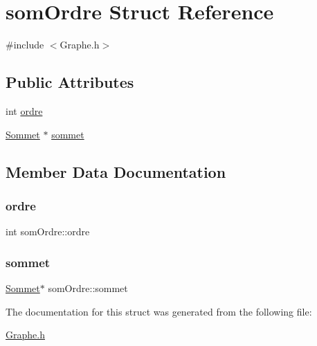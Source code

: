 \hypertarget{structsom_ordre}{}\section{som\+Ordre Struct Reference}
\label{structsom_ordre}


{\ttfamily \#include $<$Graphe.\+h$>$}

\subsection*{Public Attributes}
\begin{DoxyCompactItemize}
\item 
int \mbox{\hyperlink{structsom_ordre_a187b33358f51c2bc358b19d63719c76e}{ordre}}
\item 
\mbox{\hyperlink{class_sommet}{Sommet}} $\ast$ \mbox{\hyperlink{structsom_ordre_a2a79c9dedec7b0dccf5665be5cdf434f}{sommet}}
\end{DoxyCompactItemize}


\subsection{Member Data Documentation}
\mbox{\label{structsom_ordre_a187b33358f51c2bc358b19d63719c76e}} 
\subsubsection{\texorpdfstring{ordre}{ordre}}
{\footnotesize\ttfamily int som\+Ordre\+::ordre}

\mbox{\label{structsom_ordre_a2a79c9dedec7b0dccf5665be5cdf434f}} 
\subsubsection{\texorpdfstring{sommet}{sommet}}
{\footnotesize\ttfamily \mbox{\hyperlink{class_sommet}{Sommet}}$\ast$ som\+Ordre\+::sommet}



The documentation for this struct was generated from the following file\+:\begin{DoxyCompactItemize}
\item 
\mbox{\hyperlink{_graphe_8h}{Graphe.\+h}}\end{DoxyCompactItemize}
